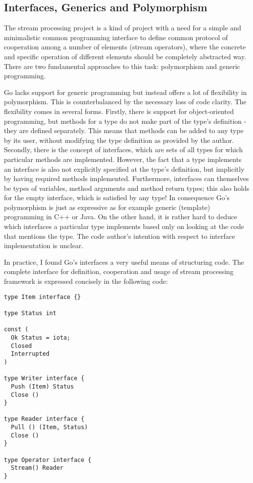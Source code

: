 \documentclass {article}
\begin{document}
\subsection {Interfaces, Generics and Polymorphism}

The stream processing project is a kind of project with a need for a simple and minimalistic common programming interface to define common protocol of cooperation among a number of elements (stream operators), where the concrete and specific operation of different elements should be completely abstracted way. There are two fundamental approaches to this task: polymorphism and generic programming.

Go lacks support for generic programming but instead offers a lot of flexibility in polymorphism. This is counterbalanced by the necessary loss of code clarity. The flexibility comes in several forms. Firstly, there is support for object-oriented programming, but methods for a type do not make part of the type's definition - they are defined separately. This means that methods can be added to any type by its user, without modifying the type definition as provided by the author. Secondly, there is the concept of interfaces, which are sets of all types for which particular methods are implemented. However, the fact that a type implements an interface is also not explicitly specified at the type's definition, but implicitly by having required methods implemented. Furthermore, interfaces can themselves be types of variables, method arguments and method return types; this also holds for the empty interface, which is satisfied by any type! In consequence Go's polymorphism is just as expressive as for example generic (template) programming in C++ or Java. On the other hand, it is rather hard to deduce which interfaces a particular type implements based only on looking at the code that mentions the type. The code author's intention with respect to interface implementation is unclear.

In practice, I found Go's interfaces a very useful means of structuring code. The complete interface for definition, cooperation and usage of stream processing framework is expressed concisely in the following code:

\begin{lstlisting}
type Item interface {}

type Status int

const (
  Ok Status = iota;
  Closed
  Interrupted
)

type Writer interface {
  Push (Item) Status
  Close ()
}

type Reader interface {
  Pull () (Item, Status)
  Close ()
}

type Operator interface {
  Stream() Reader
}
\end{lstlisting}
\end{document}
